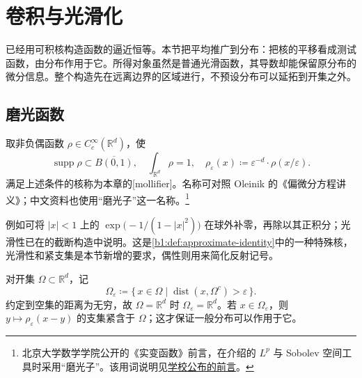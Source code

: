 \section{卷积与光滑化}
\label{b1:sec:2003}

已经用可积核构造函数的逼近恒等。本节把平均推广到分布：把核的平移看成测试函数，由分布作用于它。所得对象虽然是普通光滑函数，其导数却能保留原分布的微分信息。整个构造先在远离边界的区域进行，不预设分布可以延拓到开集之外。


\subsection{磨光函数}
\label{b1:subsec:200301}

取非负偶函数 \(\rho\in C_c^\infty(\mathbb R^d)\)，使
\[
 \operatorname{supp}\rho\subset\overline{B(0,1)},
 \quad \int_{\mathbb R^d}\rho=1,
 \quad \rho_\varepsilon(x)\coloneqq\varepsilon^{-d}\cdot \rho(x/\varepsilon).
\]
满足上述条件的核称为本章的[mollifier]。名称可对照 Oleinik 的《偏微分方程讲义》\cite[第1.2节]{Oleinik2008PDEChinese}；中文资料也使用“磨光子”这一名称。\footnote{北京大学数学学院公开的《实变函数》前言，在介绍的 \(L^p\) 与 Sobolev 空间工具时采用“磨光子”。该用词说明见\href{https://math101.pku.edu.cn/docs/2025-04/b74312fec0b54f0c90ff66270f2bded8.pdf}{学校公布的前言}。}

\ProseParagraphBreak

例如可将 \(|x|<1\) 上的 \(\exp\bigl(-1/(1-|x|^2)\bigr)\) 在球外补零，再除以其正积分；光滑性已在的截断构造中说明。这是\cref{b1:def:approximate-identity}中的一种特殊核，光滑性和紧支集是本节新增的要求，偶性则用来简化反射记号。

\ProseParagraphBreak

对开集 \(\Omega\subset\mathbb R^d\)，记
\[
 \Omega_\varepsilon
 \coloneqq\{\,x\in\Omega\mid\operatorname{dist}(x,\Omega^c)>\varepsilon\,\}.
\]
约定到空集的距离为无穷，故 \(\Omega=\mathbb R^d\) 时 \(\Omega_\varepsilon=\mathbb R^d\)。若 \(x\in\Omega_\varepsilon\)，则 \(y\mapsto\rho_\varepsilon(x-y)\) 的支集紧含于 \(\Omega\)；这才保证一般分布可以作用于它。

